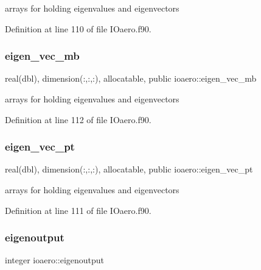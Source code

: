 arrays for holding eigenvalues and eigenvectors 



Definition at line 110 of file I\+Oaero.\+f90.

\mbox{\label{namespaceioaero_a0d150f0b81c676515b90fcf83d7ff8c3}} 
\subsubsection{\texorpdfstring{eigen\+\_\+vec\+\_\+mb}{eigen\_vec\_mb}}
{\footnotesize\ttfamily real(dbl), dimension(\+:,\+:,\+:), allocatable, public ioaero\+::eigen\+\_\+vec\+\_\+mb}



arrays for holding eigenvalues and eigenvectors 



Definition at line 112 of file I\+Oaero.\+f90.

\mbox{\label{namespaceioaero_a53e09660909f61713dee3887a3adc1ec}} 
\subsubsection{\texorpdfstring{eigen\+\_\+vec\+\_\+pt}{eigen\_vec\_pt}}
{\footnotesize\ttfamily real(dbl), dimension(\+:,\+:,\+:), allocatable, public ioaero\+::eigen\+\_\+vec\+\_\+pt}



arrays for holding eigenvalues and eigenvectors 



Definition at line 111 of file I\+Oaero.\+f90.

\mbox{\label{namespaceioaero_a8d534ecfa53489b513fc3e339bbfc064}} 
\subsubsection{\texorpdfstring{eigenoutput}{eigenoutput}}
{\footnotesize\ttfamily integer ioaero\+::eigenoutput\hspace{0.3cm}{\ttfamily [private]}}




